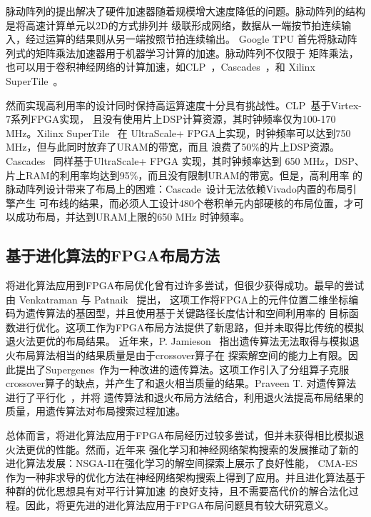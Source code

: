 脉动阵列的提出解决了硬件加速器随着规模增大速度降低的问题。脉动阵列的结构是将高速计算单元以2D的方式排列并
级联形成网络，数据从一端按节拍连续输入，经过运算的结果则从另一端按照节拍连续输出。
Google TPU 首先将脉动阵列式的矩阵乘法加速器用于机器学习计算的加速。脉动阵列不仅限于
矩阵乘法，也可以用于卷积神经网络的计算加速，如CLP~\cite{yongming_systolic-clp_isca2017,yongming_systolic-clp_fpl2016}，Cascades~\cite{nachiket_stc_fpl2019}，和 Xilinx SuperTile~\cite{supertile_fpga19, supertile_fpl17}。

然而实现高利用率的设计同时保持高运算速度十分具有挑战性。CLP~\cite{yongming_systolic-clp_isca2017,yongming_systolic-clp_fpl2016}基于Virtex-7系列FPGA实现，
且没有使用片上DSP计算资源，其时钟频率仅为100-170 MHz。Xilinx SuperTile~\cite{supertile_fpga19, supertile_fpl17} 在
UltraScale+ FPGA上实现，时钟频率可以达到750 MHz，但与此同时放弃了URAM的带宽，而且
浪费了50\%的片上DSP资源。Cascades~\cite{nachiket_stc_fpl2019} 同样基于UltraScale+ FPGA 实现，其时钟频率达到
650 MHz，DSP、片上RAM的利用率均达到95\%，而且没有限制URAM的带宽。但是，高利用率
的脉动阵列设计带来了布局上的困难：Cascade~\cite{nachiket_stc_fpl2019}设计无法依赖Vivado内置的布局引擎产生
可布线的结果，而必须人工设计480个卷积单元内部硬核的布局位置，才可以成功布局，并达到URAM上限的650 MHz
时钟频率。
\vspace{-0.2in}

\subsection{基于进化算法的FPGA布局方法}

将进化算法应用到FPGA布局优化曾有过许多尝试，但很少获得成功。最早的尝试由 Venkatraman 与 Patnaik~\cite{venkatraman2000evolutionary} 提出，
这项工作将FPGA上的元件位置二维坐标编码为遗传算法的基因型，并且使用基于关键路径长度估计和空间利用率的
目标函数进行优化。这项工作为FPGA布局方法提供了新思路，但并未取得比传统的模拟退火法更优的布局结果。
近年来，P. Jamieson~\cite{jamieson2010revisiting, jamieson2011exploring} 指出遗传算法无法取得与模拟退火布局算法相当的结果质量是由于crossover算子在
探索解空间的能力上有限。因此提出了Supergenes~\cite{jamieson2013supergenes}作为一种改进的遗传算法。这项工作引入了分组算子克服
crossover算子的缺点，并产生了和退火相当质量的结果。Praveen T. 对遗传算法进行了平行化~\cite{praveen2016multi}，并将
遗传算法和退火布局方法结合，利用退火法提高布局结果的质量，用遗传算法对布局搜索过程加速。

总体而言，将进化算法应用于FPGA布局经历过较多尝试，但并未获得相比模拟退火法更优的性能。然而，近年来
强化学习和神经网络架构搜索的发展推动了新的进化算法发展：NSGA-II在强化学习的解空间探索上展示了良好性能\cite{li2019deep,lu2019nsga}，
CMA-ES作为一种非求导的优化方法在神经网络架构搜索上得到了应用\cite{nn2016cma}。并且进化算法基于种群的优化思想具有对平行计算加速
的良好支持，且不需要高代价的解合法化过程。因此，将更先进的进化算法应用于FPGA布局问题具有较大研究意义。



